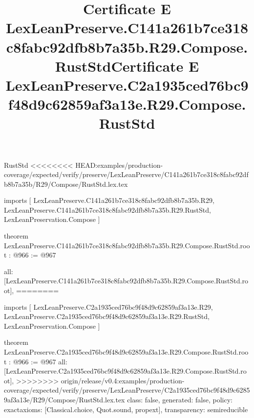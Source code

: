 \begin{lexlean}{RustStd}
<<<<<<<< HEAD:examples/production-coverage/expected/verify/preserve/LexLeanPreserve/C141a261b7ce318c8fabc92dfb8b7a35b/R29/Compose/RustStd.lex.tex
\title{Certificate E LexLeanPreserve.C141a261b7ce318c8fabc92dfb8b7a35b.R29.Compose.RustStd}
\begin{coremodule}
imports [
  LexLeanPreserve.C141a261b7ce318c8fabc92dfb8b7a35b.R29,
  LexLeanPreserve.C141a261b7ce318c8fabc92dfb8b7a35b.R29.RustStd,
  LexLeanPreservation.Compose
]

theorem LexLeanPreserve.C141a261b7ce318c8fabc92dfb8b7a35b.R29.Compose.RustStd.root : @966 := @967 {
  all: [LexLeanPreserve.C141a261b7ce318c8fabc92dfb8b7a35b.R29.Compose.RustStd.root],
========
\title{Certificate E LexLeanPreserve.C2a1935ced76bc9f48d9c62859af3a13e.R29.Compose.RustStd}
\begin{coremodule}
imports [
  LexLeanPreserve.C2a1935ced76bc9f48d9c62859af3a13e.R29,
  LexLeanPreserve.C2a1935ced76bc9f48d9c62859af3a13e.R29.RustStd,
  LexLeanPreservation.Compose
]

theorem LexLeanPreserve.C2a1935ced76bc9f48d9c62859af3a13e.R29.Compose.RustStd.root : @966 := @967 {
  all: [LexLeanPreserve.C2a1935ced76bc9f48d9c62859af3a13e.R29.Compose.RustStd.root],
>>>>>>>> origin/release/v0.4:examples/production-coverage/expected/verify/preserve/LexLeanPreserve/C2a1935ced76bc9f48d9c62859af3a13e/R29/Compose/RustStd.lex.tex
  class: false,
  generated: false,
  policy: exact{axioms: [Classical.choice, Quot.sound, propext]},
  transparency: semireducible
}


\end{coremodule}}
\end{coremodule}
\end{lexlean}
